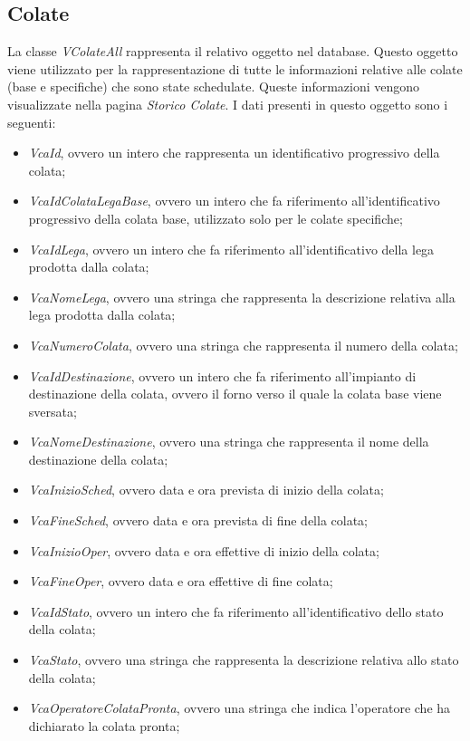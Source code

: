   \subsection{Colate}
  La classe \textit{VColateAll} rappresenta il relativo oggetto nel database. Questo oggetto viene utilizzato per la
  rappresentazione di tutte le informazioni relative alle colate (base e specifiche) che sono state schedulate. Queste
  informazioni vengono visualizzate nella pagina \textit{Storico Colate}. I dati presenti in questo oggetto sono i seguenti:
  \begin{itemize}
    \item \textit{VcaId}, ovvero un intero che rappresenta un identificativo progressivo della colata;
    \item \textit{VcaIdColataLegaBase}, ovvero un intero che fa riferimento all'identificativo progressivo della colata base,
    utilizzato solo per le colate specifiche;
    \item \textit{VcaIdLega}, ovvero un intero che fa riferimento all'identificativo della lega prodotta dalla colata;
    \item \textit{VcaNomeLega}, ovvero una stringa che rappresenta la descrizione relativa alla lega prodotta dalla colata;
    \item \textit{VcaNumeroColata}, ovvero una stringa che rappresenta il numero della colata;
    \item \textit{VcaIdDestinazione}, ovvero un intero che fa riferimento all'impianto di destinazione della colata, ovvero
    il forno verso il quale la colata base viene sversata;
    \item \textit{VcaNomeDestinazione}, ovvero una stringa che rappresenta il nome della destinazione della colata;
    \item \textit{VcaInizioSched}, ovvero data e ora prevista di inizio della colata;
    \item \textit{VcaFineSched}, ovvero data e ora prevista di fine della colata;
    \item \textit{VcaInizioOper}, ovvero data e ora effettive di inizio della colata;
    \item \textit{VcaFineOper}, ovvero data e ora effettive di fine colata;
    \item \textit{VcaIdStato}, ovvero un intero che fa riferimento all'identificativo dello stato della colata;
    \item \textit{VcaStato}, ovvero una stringa che rappresenta la descrizione relativa allo stato della colata;
    \item \textit{VcaOperatoreColataPronta}, ovvero una stringa che indica l'operatore che ha dichiarato la colata pronta;

\end{itemize}
